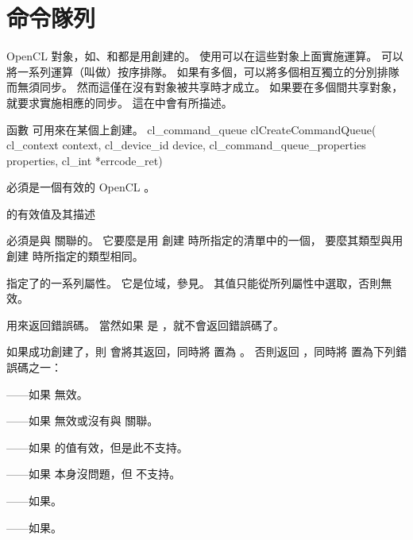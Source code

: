 \section{命令隊列}

OpenCL 對象，如、和都是用創建的。
使用可以在這些對象上面實施運算。
可以將一系列運算（叫做）按序排隊。
如果有多個，可以將多個相互獨立的分別排隊而無須同步。
然而這僅在沒有對象被共享時才成立。
如果要在多個間共享對象，就要求實施相應的同步。
這在中會有所描述。

函數  可用來在某個上創建。
\startclc
cl_command_queue clCreateCommandQueue(
			cl_context context,
			cl_device_id device,
			cl_command_queue_properties properties,
			cl_int *errcode_ret)
\stopclc

 必須是一個有效的 OpenCL 。

\startbuffer[tblcmdqprop]
的有效值及其描述
\stopbuffer
{}
{}

 必須是與  關聯的。
它要麼是用  創建  時所指定的清單中的一個，
要麼其類型與用  創建  時所指定的類型相同。

 指定了的一系列屬性。
它是位域，參見。
其值只能從所列屬性中選取，否則無效。

 用來返回錯誤碼。
當然如果  是 ，就不會返回錯誤碼了。

如果成功創建了，則  會將其返回，同時將  置為 。
否則返回 ，同時將  置為下列錯誤碼之一：
\startigBase
\item {}——如果  無效。
\item {}——如果  無效或沒有與  關聯。
\item {}——如果  的值有效，但是此不支持。
\item {}——如果  本身沒問題，但  不支持。
\item {}——如果\scdevfailres。
\item {}——如果\schostfailres。
\stopigBase

